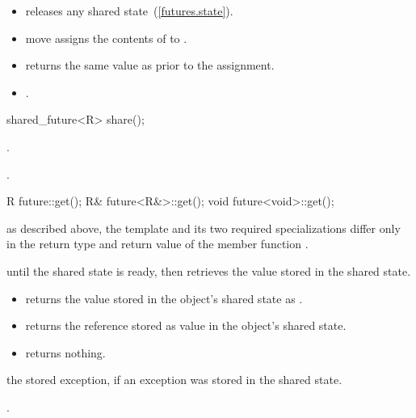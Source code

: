 \begin{itemdescr}
\pnum
\effects
\begin{itemize}
\item
releases any shared state~(\ref{futures.state}).

\item
move assigns the contents of  to .
\end{itemize}

\pnum
\postconditions
\begin{itemize}
\item
{} returns the same value as  prior to the
assignment.

\item
{}.
\end{itemize}
\end{itemdescr}

%
%
\begin{itemdecl}
shared_future<R> share();
\end{itemdecl}

\begin{itemdescr}
\pnum
\returns {}.

\pnum
\postcondition {}.
\end{itemdescr}

%
%
\begin{itemdecl}
R future::get();
R& future<R&>::get();
void future<void>::get();
\end{itemdecl}

\begin{itemdescr}
\pnum
\realnote as described above, the template and its two required specializations differ only in
the return type and return value of the member function .

\pnum
\effects {} until the shared state is ready, then retrieves the
value stored in the shared state.

\pnum
\returns
\begin{itemize}
\item
{} returns the value  stored in the object's shared state as
.

\item
{} returns the reference stored as value in the object's shared state.

\item
{} returns nothing.
\end{itemize}

\pnum
\throws the stored exception, if an exception was stored in the shared state.

\pnum
\postcondition {}.
\end{itemdescr}

